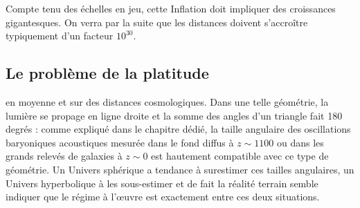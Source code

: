 Compte tenu des échelles en jeu, cette Inflation doit impliquer des croissances gigantesques. On verra par la suite que les distances doivent s'accroître typiquement d'un facteur $10^{30}$.


\subsection{Le problème de la platitude}
 en moyenne et sur des distances cosmologiques. Dans une telle géométrie, la lumière se propage en ligne droite et la somme des angles d'un triangle fait 180 degrés : comme expliqué dans le chapitre dédié, la taille angulaire des oscillations baryoniques acoustiques mesurée dans le fond diffus à $z\sim1100$ ou dans les grands relevés de galaxies à $z\sim 0$ est hautement compatible avec ce type de géométrie. Un Univers sphérique a tendance à surestimer ces tailles angulaires, un Univers hyperbolique à les sous-estimer et de fait la réalité terrain semble indiquer que le régime à l'œuvre est exactement entre ces deux situations.

